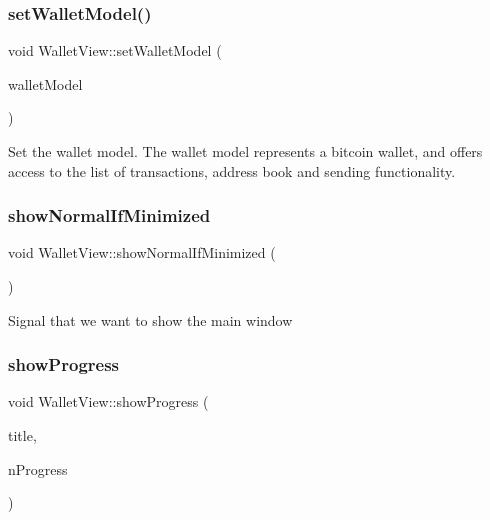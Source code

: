 \subsubsection{\texorpdfstring{set\+Wallet\+Model()}{setWalletModel()}}
{\footnotesize\ttfamily void Wallet\+View\+::set\+Wallet\+Model (\begin{DoxyParamCaption}\item[{\mbox{\hyperlink{class_wallet_model}{Wallet\+Model}} $\ast$}]{wallet\+Model }\end{DoxyParamCaption})}

Set the wallet model. The wallet model represents a bitcoin wallet, and offers access to the list of transactions, address book and sending functionality. \mbox{\label{class_wallet_view_aac71ea140f87cd60081b56e579b6fa0c}} 
\subsubsection{\texorpdfstring{show\+Normal\+If\+Minimized}{showNormalIfMinimized}}
{\footnotesize\ttfamily void Wallet\+View\+::show\+Normal\+If\+Minimized (\begin{DoxyParamCaption}{ }\end{DoxyParamCaption})\hspace{0.3cm}{\ttfamily [signal]}}

Signal that we want to show the main window \mbox{\label{class_wallet_view_a8a1f4b689abc0f1073c547ec1f871a26}} 
\subsubsection{\texorpdfstring{show\+Progress}{showProgress}}
{\footnotesize\ttfamily void Wallet\+View\+::show\+Progress (\begin{DoxyParamCaption}\item[{const Q\+String \&}]{title,  }\item[{int}]{n\+Progress }\end{DoxyParamCaption})\hspace{0.3cm}{\ttfamily [slot]}}


